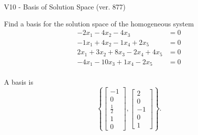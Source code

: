 \begin{exercise}
  \begin{exerciseTitle}V10 - Basis of Solution Space (ver. 877)\end{exerciseTitle}
  \begin{exerciseStatement}
    Find a basis for the solution space of the homogeneous system 
\begin{align*}
 -2 x_ 1 -4 x_ 2 -4 x_ 3 &= 0  \\ 
  -1 x_ 1 + 4 x_ 2 -1 x_ 4 + 2 x_ 5 &= 0  \\ 
  2 x_ 1 + 3 x_ 2 + 8 x_ 3 -2 x_ 4 + 4 x_ 5 &= 0  \\ 
  -4 x_ 1 -10 x_ 3 + 1 x_ 4 -2 x_ 5 &= 0  \\ 
 \end{align*}


 
  \end{exerciseStatement}

  \begin{exerciseAnswer}
   A basis is   
\[\left\{\left[\begin{array}{c}
-1 \\
0 \\
\frac{1}{2} \\
1 \\
0
\end{array}\right] , \left[\begin{array}{c}
2 \\
0 \\
-1 \\
0 \\
1
\end{array}\right]\right\}.\]

  


  \end{exerciseAnswer}
\end{exercise}